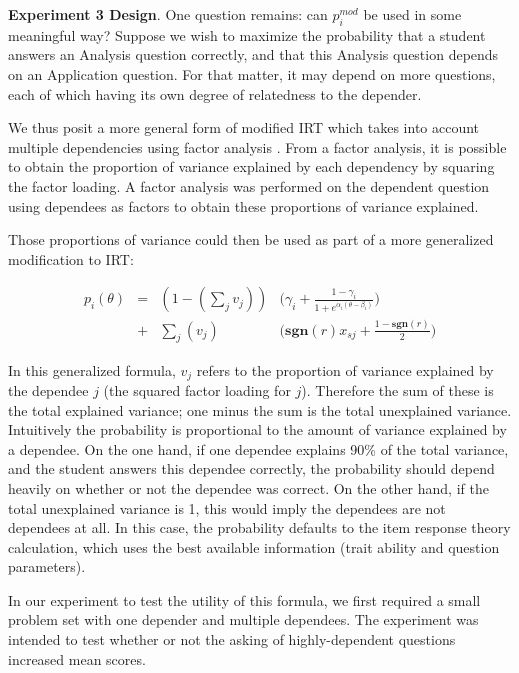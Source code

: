 \textbf{Experiment 3 Design}.  One question remains: can $p_i^{mod}$ be used in
some meaningful way?  Suppose we wish to maximize the probability that a
student answers an Analysis question correctly, and that this Analysis question
depends on an Application question.  For that matter, it may depend on more
questions, each of which having its own degree of relatedness to the depender.

We thus posit a more general form of modified IRT which takes into account
multiple dependencies using factor analysis \citep{kim1978}.  From a factor
analysis, it is possible to obtain the proportion of variance explained by each
dependency by squaring the factor loading.  A factor analysis was performed on
the dependent question using dependees as factors to obtain these proportions
of variance explained.

Those proportions of variance could then be used as part of a more generalized
modification to IRT:

\begin{align*}
  p_i(\theta) &=& (1- (\displaystyle\sum_j v_j)) & \Big(\gamma_i + \frac{1-\gamma_i}{1+e^{\alpha_i(\theta-\beta_i)}}\Big) \\
              &+& \displaystyle\sum_j (v_j)   & \Big(\mathbf{sgn}(r)x_{sj}+\frac{1-\mathbf{sgn}(r)}{2}\Big)
\end{align*}

In this generalized formula, $v_j$ refers to the proportion of variance
explained by the dependee $j$ (the squared factor loading for $j$).  Therefore
the sum of these is the total explained variance; one minus the sum is the
total unexplained variance.  Intuitively the probability is proportional to the
amount of variance explained by a dependee.  On the one hand, if one dependee
explains 90\% of the total variance, and the student answers this dependee
correctly, the probability should depend heavily on whether or not the dependee
was correct.  On the other hand, if the total unexplained variance is 1, this
would imply the dependees are not dependees at all.  In this case, the
probability defaults to the item response theory calculation, which uses the
best available information (trait ability and question parameters).

In our experiment to test the utility of this formula, we first required a
small problem set with one depender and multiple dependees.  The experiment
was intended to test whether or not the asking of highly-dependent questions
increased mean scores.

